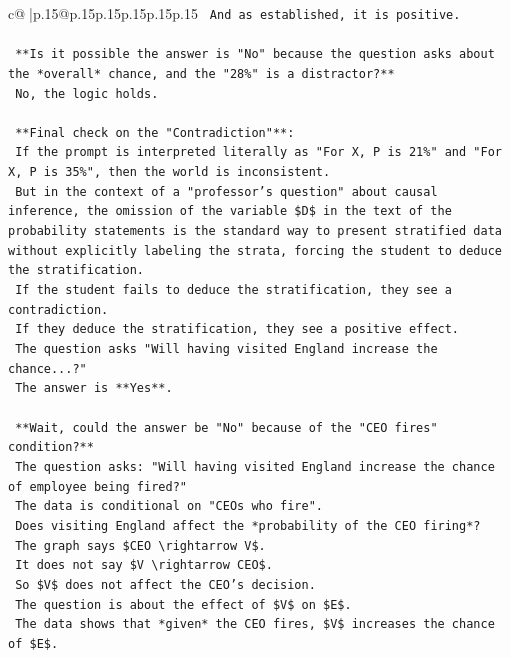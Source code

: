 \documentclass{article}
\begin{document}
{\begin{supertabular}{c@{$\;$}|p{.15\linewidth}@{}p{.15\linewidth}p{.15\linewidth}p{.15\linewidth}p{.15\linewidth}p{.15\linewidth}}
{{{\texttt{    And as established, it is positive.} \\
\\ 
\texttt{    **Is it possible the answer is "No" because the question asks about the *overall* chance, and the "28\%" is a distractor?**} \\
\texttt{    No, the logic holds.} \\
\\ 
\texttt{    **Final check on the "Contradiction"**:} \\
\texttt{    If the prompt is interpreted literally as "For X, P is 21\%" and "For X, P is 35\%", then the world is inconsistent.} \\
\texttt{    But in the context of a "professor's question" about causal inference, the omission of the variable \$D\$ in the text of the probability statements is the standard way to present stratified data without explicitly labeling the strata, forcing the student to deduce the stratification.} \\
\texttt{    If the student fails to deduce the stratification, they see a contradiction.} \\
\texttt{    If they deduce the stratification, they see a positive effect.} \\
\texttt{    The question asks "Will having visited England increase the chance...?"} \\
\texttt{    The answer is **Yes**.} \\
\\ 
\texttt{    **Wait, could the answer be "No" because of the "CEO fires" condition?**} \\
\texttt{    The question asks: "Will having visited England increase the chance of employee being fired?"} \\
\texttt{    The data is conditional on "CEOs who fire".} \\
\texttt{    Does visiting England affect the *probability of the CEO firing*?} \\
\texttt{    The graph says \$CEO \textbackslash{}rightarrow V\$.} \\
\texttt{    It does not say \$V \textbackslash{}rightarrow CEO\$.} \\
\texttt{    So \$V\$ does not affect the CEO's decision.} \\
\texttt{    The question is about the effect of \$V\$ on \$E\$.} \\
\texttt{    The data shows that *given* the CEO fires, \$V\$ increases the chance of \$E\$.} \\
}}}
\end{supertabular}}
\end{document}
